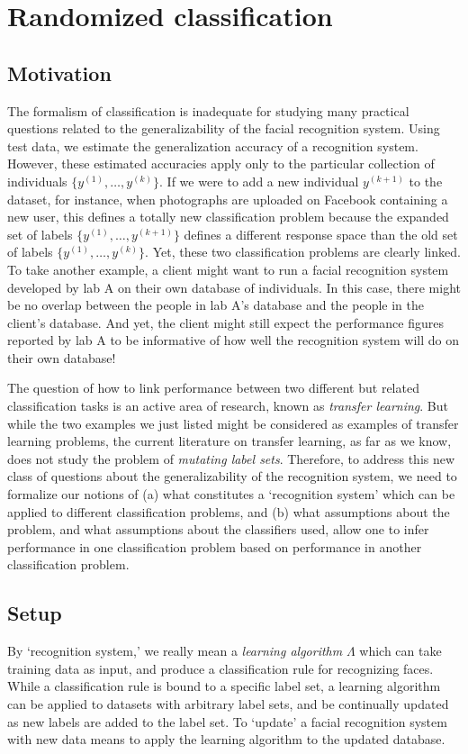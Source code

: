 \documentclass[12pt]{article}
\begin{document}
\section{Randomized classification}\label{sec:rc_motivation}

\subsection{Motivation}
The formalism of classification is inadequate for studying many
practical questions related to the generalizability of the facial
recognition system.  Using test data, we estimate the generalization
accuracy of a recognition system.  However, these estimated accuracies
apply only to the particular collection of individuals
$\{y^{(1)},\hdots, y^{(k)}\}$.  If we were to add a new individual
$y^{(k+1)}$ to the dataset, for instance, when photographs are
uploaded on Facebook containing a new user, this defines a totally new
classification problem because the expanded set of labels
$\{y^{(1)},\hdots, y^{(k+1)}\}$ defines a different response space
than the old set of labels $\{y^{(1)},\hdots, y^{(k)}\}$.  Yet, these
two classification problems are clearly linked.  To take another
example, a client might want to run a facial recognition system
developed by lab A on their own database of individuals.  In this
case, there might be no overlap between the people in lab A's database
and the people in the client's database.  And yet, the client might
still expect the performance figures reported by lab A to be
informative of how well the recognition system will do on their own
database!

The question of how to link performance between two different but
related classification tasks is an active area of research, known as
\emph{transfer learning}.  But while the two examples we just listed
might be considered as examples of transfer learning problems, the
current literature on transfer learning, as far as we know, does not
study the problem of \emph{mutating label sets}.  Therefore, to
address this new class of questions about the generalizability of the
recognition system, we need to formalize our notions of (a) what
constitutes a `recognition system' which can be applied to different
classification problems, and (b) what assumptions about the problem,
and what assumptions about the classifiers used, allow one to infer
performance in one classification problem based on performance in
another classification problem.

\subsection{Setup}
By `recognition system,' we really mean a \emph{learning algorithm}
$\Lambda$ which can take training data as input, and produce a
classification rule for recognizing faces.  While a classification
rule is bound to a specific label set, a learning algorithm can be
applied to datasets with arbitrary label sets, and be continually
updated as new labels are added to the label set.  To `update' a
facial recognition system with new data means to apply the learning
algorithm to the updated database.
\end{document}
